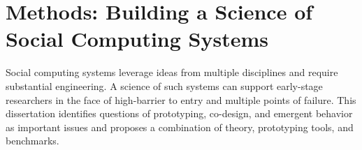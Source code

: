 %
%
%
%
%
%


\section{Methods: Building a Science of Social Computing Systems}

Social computing systems leverage ideas from multiple disciplines and require substantial engineering. A science of such systems can support early-stage researchers in the face of high-barrier to entry and multiple points of failure. This dissertation identifies questions of prototyping, co-design, and emergent behavior as important issues and proposes a combination of theory, prototyping tools, and benchmarks. 


